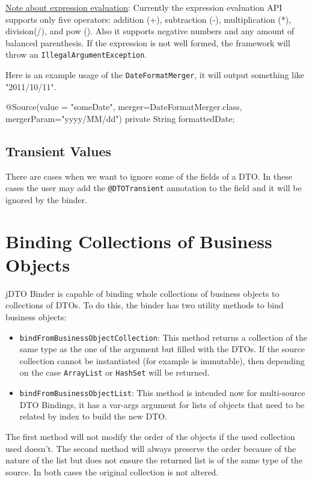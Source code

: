 \documentclass[11pt]{article}
\newcommand{\JDTO}{jDTO Binder\xspace}
\begin{document}
\underline{Note about expression evaluation}: Currently the expression evaluation API supports only five operators: addition (+), subtraction (-), multiplication (*), division(/), and pow (). Also it supports negative numbers and any amount of balanced parenthesis. If the expression is not well formed, the framework will throw an \texttt{IllegalArgumentException}.

Here is an example usage of the \texttt{DateFormatMerger}, it will output something like "2011/10/11".


\begin{java}
@Source(value = "someDate", 
    merger=DateFormatMerger.class, mergerParam="yyyy/MM/dd")
private String formattedDate;
\end{java}

\subsection{Transient Values}


There are cases when we want to ignore some of the fields of a DTO. In these cases the user may add the \texttt{@DTOTransient} annotation to the field and it will be ignored by the binder.

\section{Binding Collections of Business Objects}


\JDTO is capable of binding whole collections of business objects to collections of DTOs. To do this, the binder has two utility methods to bind business objects:

\begin{itemize}
\item \texttt{bindFromBusinessObjectCollection}: This method returns a collection of the same type as the one of the argument but filled with the DTOs. If the source collection cannot be instantiated (for example is immutable), then depending on the case \texttt{ArrayList} or \texttt{HashSet} will be returned.

\item \texttt{bindFromBusinessObjectList}: This method is intended now for multi-source DTO Bindings, it has a var-args argument for lists of objects that need to be related by index to build the new DTO.

\end{itemize}

The first method will not modify the order of the objects if the used collection used doesn't. The second method will always preserve the order because of the nature of the list but does not ensure the returned list is of the same type of the source. In both cases the original collection is not altered.
\end{document}
